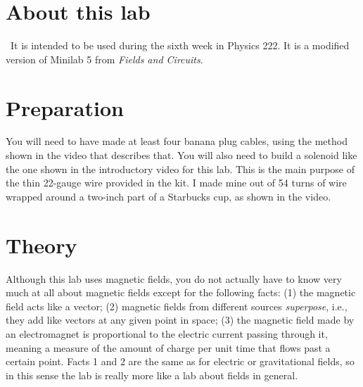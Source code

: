 \renewcommand\thechapter{c2.6a}
\label{lab:dipole-and-superposition}

\section*{About this lab}

\covid\ 
It is intended to be used during the sixth week in Physics 222.
It is a modified version of Minilab 5 from \emph{Fields and Circuits}.

\apparatus
{}
\equip{ferrite disk magnet}

\section*{Preparation}
You will need to have made at least four banana plug cables, using the method shown in the video that describes that.
You will also need to build a solenoid like the one shown in the introductory video for this lab. This is the main
purpose of the thin 22-gauge wire provided in the kit. I made mine out of 54 turns of wire wrapped around a two-inch part of
a Starbucks cup, as shown in the video.

\section*{Theory}

Although this lab uses magnetic fields, you do not actually have to know very much at all about magnetic fields except for
the following facts: (1) the magnetic field acts like a vector; (2) magnetic fields from different sources \emph{superpose}, i.e.,
they add like vectors at any given point in space; (3) the magnetic field made by an electromagnet is proportional to the electric
current passing through it, meaning a measure of the amount of charge per unit time that flows past a certain point.
Facts 1 and 2 are the same as for electric or gravitational fields, so in this sense the lab is really more like a lab about
fields in general.

